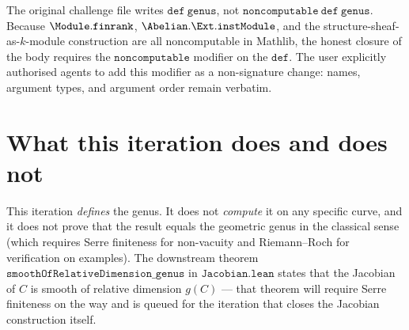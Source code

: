 The original challenge file writes \(\mathtt{def\ genus}\), not \(\mathtt{noncomputable\ def\ genus}\). Because \(\Module.\mathtt{finrank}\), \(\Abelian.\Ext.\mathtt{instModule}\), and the structure-sheaf-as-\(k\)-module construction are all noncomputable in Mathlib, the honest closure of the body requires the \(\mathtt{noncomputable}\) modifier on the \(\mathtt{def}\). The user explicitly authorised agents to add this modifier as a non-signature change: names, argument types, and argument order remain verbatim.

\section{What this iteration does and does not}

This iteration \emph{defines} the genus. It does not \emph{compute} it on any specific curve, and it does not prove that the result equals the geometric genus in the classical sense (which requires Serre finiteness for non-vacuity and Riemann--Roch for verification on examples). The downstream theorem \(\mathtt{smoothOfRelativeDimension\_genus}\) in \(\mathtt{Jacobian.lean}\) states that the Jacobian of \(C\) is smooth of relative dimension \(g(C)\) --- that theorem will require Serre finiteness on the way and is queued for the iteration that closes the Jacobian construction itself.
